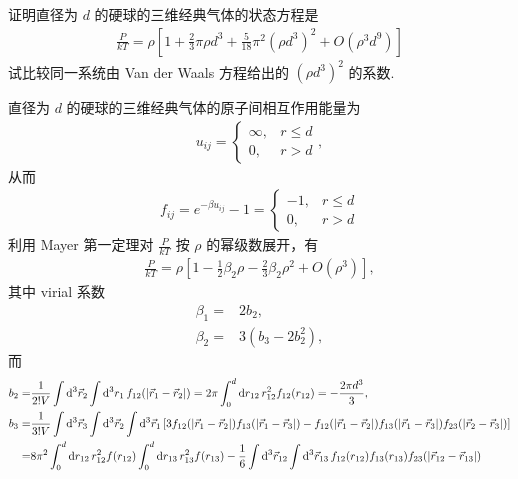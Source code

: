 \documentclass{assignment}
\begin{document}
\begin{prob}
    证明直径为 $d$ 的硬球的三维经典气体的状态方程是
    \begin{align}
        \frac{P}{kT}=\rho\left[1+\frac{2}{3}\pi\rho d^3+\frac{5}{18}\pi^2(\rho d^3)^2+O(\rho^3d^9)\right]
    \end{align}
    试比较同一系统由 Van der Waals 方程给出的 $(\rho d^3)^2$ 的系数.
\end{prob}
\begin{pf}
    直径为 $d$ 的硬球的三维经典气体的原子间相互作用能量为
    \begin{align}
        u_{ij}=\left\{\begin{array}{ll}
            \infty,&r\leq d\\
            0,&r>d
        \end{array}\right.,
    \end{align}
    从而
    \begin{align}
        f_{ij}=e^{-\beta u_{ij}}-1=\left\{\begin{array}{ll}
            -1,&r\leq d\\
            0,&r>d
        \end{array}\right.
    \end{align}
    利用 Mayer 第一定理对 $\frac{P}{kT}$ 按 $\rho$ 的幂级数展开，有
    \begin{align}
        \frac{P}{kT}=\rho\left[1-\frac{1}{2}\beta_2\rho-\frac{2}{3}\beta_2\rho^2+O(\rho^3)\right],
    \end{align}
    其中 virial 系数
    \begin{align}
        \beta_1=&2b_2,\\
        \beta_2=&3(b_3-2b_2^2),
    \end{align}
    而
    \begin{align}
        b_2=&\frac{1}{2!V}\int\mathrm{d}^3\vec{r}_2\int\mathrm{d}^3r_1\,f_{12}(\abs{\vec{r}_1-\vec{r}_2})=2\pi\int_0^d\mathrm{d}r_{12}\,r_{12}^2f_{12}(r_{12})=-\frac{2\pi d^3}{3},\\
        \notag b_3=&\frac{1}{3!V}\int\mathrm{d}^3\vec{r}_3\int\mathrm{d}^3\vec{r}_2\int\mathrm{d}^3\vec{r}_1\,[3f_{12}(\abs{\vec{r}_1-\vec{r}_2})f_{13}(\abs{\vec{r}_1-\vec{r}_3})-f_{12}(\abs{\vec{r}_1-\vec{r}_2})f_{13}(\abs{\vec{r}_1-\vec{r}_3})f_{23}(\abs{\vec{r}_2-\vec{r}_3})]\\
        \notag=&8\pi^2\int_0^d\mathrm{d}r_{12}\,r_{12}^2f(r_{12})\int_0^d\mathrm{d}r_{13}\,r_{13}^2f(r_{13})-\frac{1}{6}\int\mathrm{d}^3\vec{r}_{12}\int\mathrm{d}^3\vec{r}_{13}\,f_{12}(r_{12})f_{13}(r_{13})f_{23}(\abs{\vec{r}_{12}-\vec{r}_{13}})\\

\end{align}
\end{pf}
\end{document}
